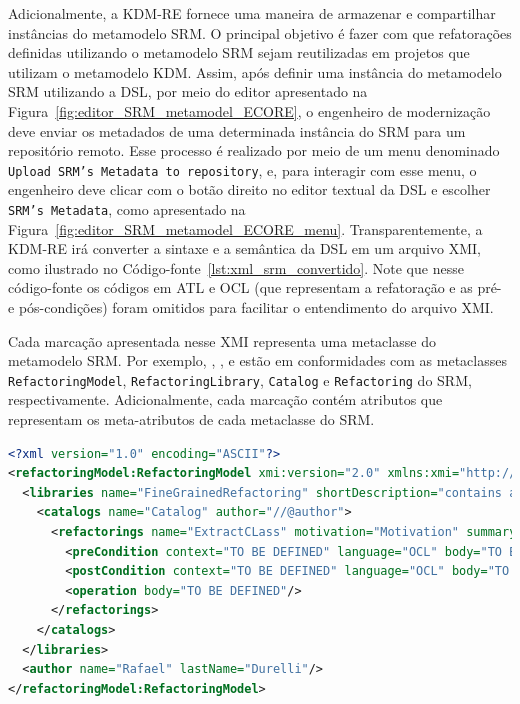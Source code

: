 Adicionalmente, a KDM-RE fornece uma maneira de armazenar e compartilhar instâncias do metamodelo SRM. O principal objetivo é fazer com que refatorações definidas utilizando o metamodelo SRM sejam reutilizadas em projetos que utilizam o metamodelo KDM. Assim, após definir uma instância do metamodelo SRM utilizando a DSL, por meio do editor apresentado na Figura~\ref{fig:editor_SRM_metamodel_ECORE}, o engenheiro de modernização deve enviar os metadados de uma determinada instância do SRM para um repositório remoto. Esse processo é realizado por meio de um menu denominado \texttt{Upload SRM's Metadata to repository}, e, para interagir com esse menu, o engenheiro deve clicar com o botão direito no editor textual da DSL e escolher \texttt{SRM's Metadata}, como apresentado na Figura~\ref{fig:editor_SRM_metamodel_ECORE_menu}. Transparentemente, a KDM-RE irá converter a sintaxe e a semântica da DSL em um arquivo XMI, como ilustrado no Código-fonte~\ref{lst:xml_srm_convertido}. Note que nesse código-fonte os códigos em ATL e OCL (que representam a refatoração e as pré- e pós-condições) foram omitidos para facilitar o entendimento do arquivo XMI. 

Cada marcação apresentada nesse XMI representa uma metaclasse do metamodelo SRM. Por exemplo, , ,  e  estão em conformidades com as metaclasses \texttt{RefactoringModel}, \texttt{RefactoringLibrary}, \texttt{Catalog} e \texttt{Refactoring} do SRM, respectivamente. Adicionalmente, cada marcação contém atributos que representam os meta-atributos de cada metaclasse do SRM.

\begin{lstlisting}[language=XML, frame=single, basicstyle={\scriptsize}, mathescape=true, label={lst:xml_srm_convertido}, caption={Arquivo XMI representando a instância do SRM.}]
<?xml version="1.0" encoding="ASCII"?>
<refactoringModel:RefactoringModel xmi:version="2.0" xmlns:xmi="http://www.omg.org/XMI" xmlns:xsi="http://www.w3.org/2001/XMLSchema-instance" xmlns:refactoringModel="http://refactoringModel/1.0">
  <libraries name="FineGrainedRefactoring" shortDescription="contains a set of refactorings" description="refactorings">
    <catalogs name="Catalog" author="//@author">
      <refactorings name="ExtractCLass" motivation="Motivation" summary="Summary">
        <preCondition context="TO BE DEFINED" language="OCL" body="TO BE DEFINED"/>
        <postCondition context="TO BE DEFINED" language="OCL" body="TO BE DEFINED"/>
        <operation body="TO BE DEFINED"/>
      </refactorings>
    </catalogs>
  </libraries>
  <author name="Rafael" lastName="Durelli"/>
</refactoringModel:RefactoringModel>
\end{lstlisting}


